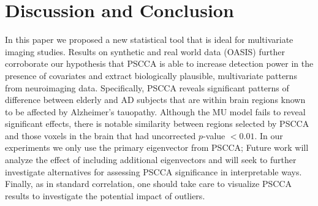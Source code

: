 \documentclass{llncs}
\newcommand{\X}{{\bf X}}
\newcommand{\Y}{{\bf Y}}
\begin{document}
\section{Discussion and Conclusion}
In this paper we proposed a new statistical tool that is
ideal for multivariate imaging studies. 
Results on synthetic and
real world data (OASIS) further corroborate our hypothesis that PSCCA
is able to increase detection power in the presence of covariates and
extract biologically plausible, multivariate patterns from neuroimaging
data.  Specifically, PSCCA reveals significant patterns of difference
between elderly and AD subjects that are within brain regions known to
be affected by Alzheimer's tauopathy.  Although the MU model fails to reveal
significant effects, there is notable similarity between regions selected by PSCCA and
those voxels in the brain that had uncorrected $p$-value $< 0.01$.  %
In our experiments we only use the
primary eigenvector from PSCCA;
Future work will analyze the effect of including additional
eigenvectors and will seek to further investigate alternatives for
assessing PSCCA significance in interpretable ways. Finally, as in standard correlation, one should take care to visualize PSCCA results to investigate the potential impact of outliers. 







\end{document}
